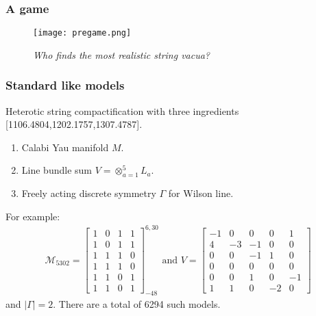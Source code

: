 \documentclass{beamer}
\begin{document}
\begin{frame}
\frametitle{A game}
\begin{figure}
	\centering
	\texttt{[image: pregame.png]}
	\caption{\it Who finds the most realistic string vacua?}
\end{figure}
\end{frame}


\begin{frame}
\frametitle{Standard like models}
Heterotic string compactification with three ingredients {\color{blue} [1106.4804,1202.1757,1307.4787]}.
\begin{enumerate}
	\item Calabi Yau manifold $M$. \item Line bundle sum $V = \otimes_{a=1}^5 L_a$. \item Freely acting discrete symmetry $\Gamma$ for Wilson line.
\end{enumerate}
For example:
\begin{align}
\mathcal{M}_{5302} =  \left[
\begin{array}{c||ccc}
1 & 0 & 1 & 1 \\
1 & 0 & 1 & 1 \\
1 & 1 & 1 & 0 \\
1 & 1 & 1 & 0 \\
1 & 1 & 0 & 1 \\
1 & 1 & 0 & 1
\end{array}
\right]^{6,30}_{-48} \text{ and }  V = \left[\begin{array}{ccccc}
-1& 0& 0& 0& 1\\ 
4& -3& -1& 0& 0\\ 
0& 0& -1& 1& 0\\ 
0& 0& 0& 0& 0\\ 
0& 0& 1& 0& -1\\ 
1& 1& 0& -2& 0
\end{array}\right]\nonumber 
\end{align}
and $|\Gamma| = 2$. There are a total of 6294 such models.
\end{frame}
\end{document}
